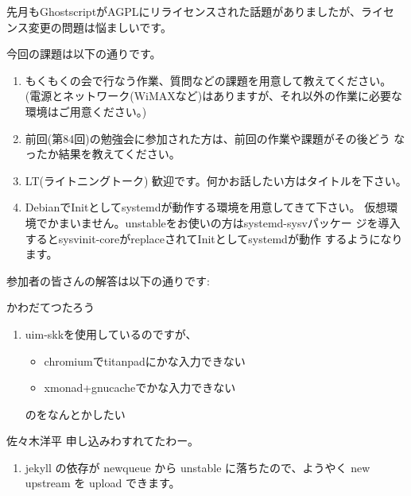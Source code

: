 \documentclass[mingoth,a4paper]{jsarticle}
\begin{document}
先月もGhostscriptがAGPLにリライセンスされた話題がありましたが、ライセ
ンス変更の問題は悩ましいです。


今回の課題は以下の通りです。
\begin{screen}
  \begin{enumerate}

  \item %
    もくもくの会で行なう作業、質問などの課題を用意して教えてください。
    (電源とネットワーク(WiMAXなど)はありますが、それ以外の作業に必要な
    環境はご用意ください。)

  \item %
    前回(第84回)の勉強会に参加された方は、前回の作業や課題がその後どう
    なったか結果を教えてください。

  \item %
    LT(ライトニングトーク) 歓迎です。何かお話したい方はタイトルを下さい。

  \item %
    DebianでInitとしてsystemdが動作する環境を用意してきて下さい。
    仮想環境でかまいません。unstableをお使いの方はsystemd-sysvパッケー
    ジを導入するとsysvinit-coreがreplaceされてInitとしてsystemdが動作
    するようになります。

  \end{enumerate}
\end{screen}

参加者の皆さんの解答は以下の通りです:

\begin{prework}{ かわだてつたろう }
  \begin{enumerate}
  \item uim-skkを使用しているのですが、
    \begin{itemize}
    \item chromiumでtitanpadにかな入力できない
    \item xmonad+gnucacheでかな入力できない
    \end{itemize}
    のをなんとかしたい
  \end{enumerate}
\end{prework}

\begin{prework}{ 佐々木洋平 }
  申し込みわすれてたわー。

  \begin{enumerate}
  \item jekyll の依存が newqueue から unstable に落ちたので、ようやく
    new upstream を upload できます。
  \end{enumerate}

\end{prework}
\end{document}

